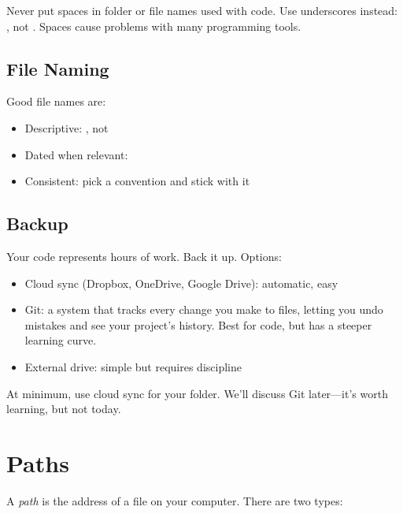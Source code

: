 \begin{warning}
Never put spaces in folder or file names used with code. Use underscores instead: , not . Spaces cause problems with many programming tools.
\end{warning}

\subsection{File Naming}

Good file names are:
\begin{itemize}
    \item Descriptive: , not 
    \item Dated when relevant: 
    \item Consistent: pick a convention and stick with it
\end{itemize}

\subsection{Backup}

Your code represents hours of work. Back it up. Options:

\begin{itemize}
    \item Cloud sync (Dropbox, OneDrive, Google Drive): automatic, easy
    \item Git: a system that tracks every change you make to files, letting you undo mistakes and see your project's history. Best for code, but has a steeper learning curve.
    \item External drive: simple but requires discipline
\end{itemize}

At minimum, use cloud sync for your  folder. We'll discuss Git later---it's worth learning, but not today.

\section{Paths}
\label{sec:paths}

A \emph{path} is the address of a file on your computer. There are two types:

